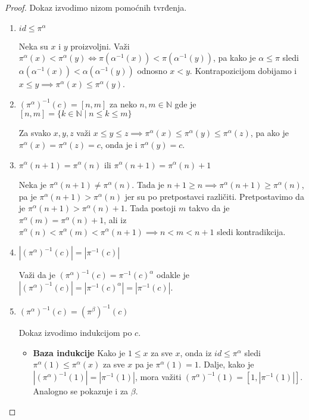 \documentclass[12pt,oneside]{memoir}
\theoremstyle{definition}
\begin{document}
  \begin{proof}
	  Dokaz izvodimo nizom pomoćnih tvrđenja.

	  \begin{enumerate}
		  \item $id \leq \pi^\alpha$

			  Neka su $x$ i $y$ proizvoljni. Važi $\pi^\alpha(x) <
			  \pi^\alpha(y) \iff \pi(\alpha^{-1}(x)) < \pi(\alpha^{-1}(y))$, pa
			  kako je $\alpha \leq \pi$ sledi $\alpha(\alpha^{-1}(x)) <
			  \alpha(\alpha^{-1}(y))$ odnosno $x < y$. Kontrapozicijom dobijamo
			  i $x \leq y \implies \pi^\alpha(x) \leq \pi^\alpha(y)$.

		  \item $(\pi^\alpha)^{-1}(c) = [n, m]$ za neko $n, m \in \mathbb{N}$
			  gde je $[n, m] = \{k \in \mathbb{N} \mid n \leq k \leq m\}$

			  Za svako $x, y, z $ važi $x \leq y \leq z \implies \pi^\alpha(x)
			  \leq \pi^\alpha(y) \leq \pi^\alpha(z)$, pa ako je $\pi^\alpha(x)
			  = \pi^\alpha(z) = c$, onda je i $\pi^\alpha(y) = c$.

		  \item $\pi^\alpha(n + 1) = \pi^\alpha(n)$ ili $\pi^\alpha(n+1) =
			  \pi^\alpha(n) + 1$

			  Neka je $\pi^\alpha(n+1) \neq \pi^\alpha(n)$. Tada je $n + 1 \geq
			  n \implies \pi^\alpha(n+1) \geq \pi^\alpha(n)$, pa je
			  $\pi^\alpha(n+1) > \pi^\alpha(n)$ jer su po pretpostavci
			  različiti. Pretpostavimo da je $\pi^\alpha(n+1) > \pi^\alpha(n) +
			  1$. Tada postoji $m$ takvo da je $\pi^\alpha(m) = \pi^\alpha(n) +
			  1$, ali iz $\pi^\alpha(n) < \pi^\alpha(m) < \pi^\alpha(n+1)
			  \implies n < m < n + 1$ sledi kontradikcija.

		  \item $|(\pi^\alpha)^{-1}(c)| = |\pi^{-1}(c)|$

			  Važi da je $(\pi^\alpha)^{-1}(c) = \pi^{-1}(c)^\alpha$ odakle je
			  $|(\pi^\alpha)^{-1}(c)| = |\pi^{-1}(c)^\alpha| = |\pi^{-1}(c)|$.

		  \item $(\pi^\alpha)^{-1}(c) = (\pi^\beta)^{-1}(c)$

			  Dokaz izvodimo indukcijom po $c$.

			  \begin{itemize}
				  \item[] \textbf{Baza indukcije} Kako je $1 \leq x$ za sve
					  $x$, onda iz $id \leq \pi^\alpha$ sledi $\pi^\alpha(1)
					  \leq \pi^\alpha(x)$ za sve $x$ pa je $\pi^\alpha(1) = 1$.
					  Dalje, kako je $|(\pi^\alpha)^{-1}(1)| = |\pi^{-1}(1)|$,
					  mora važiti $(\pi^\alpha)^{-1}(1) = [1, |\pi^{-1}(1)|]$.
					  Analogno se pokazuje i za $\beta$.


\end{itemize}
\end{enumerate}
\end{proof}
\end{document}
